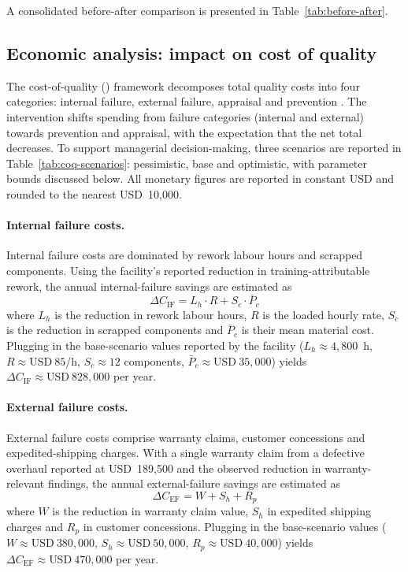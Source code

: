 A consolidated before-after comparison is presented in
Table~\ref{tab:before-after}.



\subsection{Economic analysis: impact on cost of quality}
\label{subsec:results-economic}

The cost-of-quality (\CoQ{}) framework decomposes total quality costs into
four categories: internal failure, external failure, appraisal and
prevention \citep{Pereira2017,Zhang2025}. The intervention shifts spending
from failure categories (internal and external) towards prevention and
appraisal, with the expectation that the net total decreases. To support
managerial decision-making, three scenarios are reported in
Table~\ref{tab:coq-scenarios}: pessimistic, base and optimistic, with
parameter bounds discussed below. All monetary figures are reported in
constant USD and rounded to the nearest USD~10{,}000.

\paragraph{Internal failure costs.}
Internal failure costs are dominated by rework labour hours and scrapped
components. Using the facility's reported reduction in
training-attributable rework, the annual internal-failure savings are
estimated as
\begin{equation}
  \Delta C_{\text{IF}} = L_h \cdot R + S_c \cdot \bar{P}_c
  \label{eq:internal}
\end{equation}
where $L_h$ is the reduction in rework labour hours, $R$ is the loaded
hourly rate, $S_c$ is the reduction in scrapped components and
$\bar{P}_c$ is their mean material cost. Plugging in the base-scenario
values reported by the facility ($L_h \approx 4{,}800$~h, $R \approx
\text{USD}~85$/h, $S_c \approx 12$ components, $\bar{P}_c \approx
\text{USD}~35{,}000$) yields $\Delta C_{\text{IF}} \approx \text{USD}~828{,}000$
per year.

\paragraph{External failure costs.}
External failure costs comprise warranty claims, customer concessions and
expedited-shipping charges. With a single warranty claim from a defective
overhaul reported at USD~189{,}500 \citep{Pereira2017} and the observed
reduction in warranty-relevant findings, the annual external-failure
savings are estimated as
\begin{equation}
  \Delta C_{\text{EF}} = W + S_h + R_p
  \label{eq:external}
\end{equation}
where $W$ is the reduction in warranty claim value, $S_h$ in expedited
shipping charges and $R_p$ in customer concessions. Plugging in the
base-scenario values ($W \approx \text{USD}~380{,}000$, $S_h \approx
\text{USD}~50{,}000$, $R_p \approx \text{USD}~40{,}000$) yields $\Delta
C_{\text{EF}} \approx \text{USD}~470{,}000$ per year.

